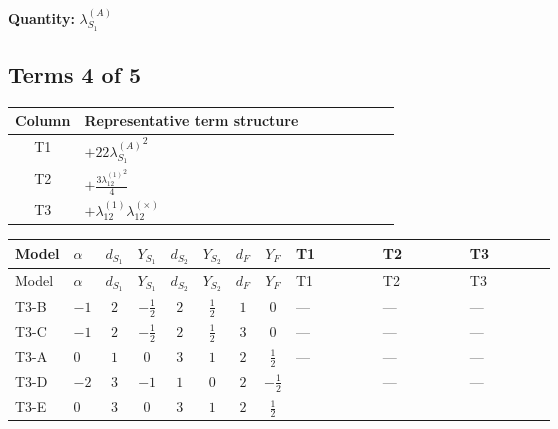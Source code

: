 \documentclass[8pt]{article}
\begin{document}
\begin{landscape}
\begin{longtable}{@{}llcccccc >{\raggedright\arraybackslash}p{0.21\linewidth} >{\raggedright\arraybackslash}p{0.21\linewidth} >{\raggedright\arraybackslash}p{0.21\linewidth}@{}}
\midrule
\bottomrule
\end{longtable}
\clearpage
\noindent\textbf{Quantity: }$\lambda_{S_1}^{(A)}$\par\smallskip
\subsection*{Terms 4 of 5}
\begin{center}
\begin{tabular}{@{}c >{\raggedright\arraybackslash}p{0.82\linewidth}@{}}
\toprule
Column & Representative term structure \\
\midrule
T1 & \(\displaystyle +22 {\lambda_{S_1}^{(A)}}^2\) \\
\midrule
T2 & \(\displaystyle +\frac{3 {\lambda_{12}^{(1)}}^2}{4}\) \\
\midrule
T3 & \(\displaystyle +{\lambda_{12}^{(1)}} {\lambda_{12}^{(\times)}}\) \\
\midrule
\bottomrule
\end{tabular}
\end{center}
\smallskip
\tiny
\begin{longtable}{@{}llcccccc >{\raggedright\arraybackslash}p{0.21\linewidth} >{\raggedright\arraybackslash}p{0.21\linewidth} >{\raggedright\arraybackslash}p{0.21\linewidth}@{}}
\toprule
Model & $\alpha$ & $d_{S_1}$ & $Y_{S_1}$ & $d_{S_2}$ & $Y_{S_2}$ & $d_F$ & $Y_F$ & T1 & T2 & T3 \\
\midrule
\endfirsthead
\toprule
Model & $\alpha$ & $d_{S_1}$ & $Y_{S_1}$ & $d_{S_2}$ & $Y_{S_2}$ & $d_F$ & $Y_F$ & T1 & T2 & T3 \\
\midrule
\endhead
T3-B & $-1$ & $2$ & $-\frac{1}{2}$ & $2$ & $\frac{1}{2}$ & $1$ & $0$ & --- & --- & --- \\
\midrule
T3-C & $-1$ & $2$ & $-\frac{1}{2}$ & $2$ & $\frac{1}{2}$ & $3$ & $0$ & --- & --- & --- \\
\midrule
T3-A & $0$ & $1$ & $0$ & $3$ & $1$ & $2$ & $\frac{1}{2}$ & --- & --- & --- \\
\midrule
T3-D & $-2$ & $3$ & $-1$ & $1$ & $0$ & $2$ & $-\frac{1}{2}$ & \scriptsize\adjustbox{max width=\linewidth}{$\begin{gathered} +22 {\lambda_{S_1}^{(A)}}^2\end{gathered}$} & --- & --- \\
\midrule
T3-E & $0$ & $3$ & $0$ & $3$ & $1$ & $2$ & $\frac{1}{2}$ & \scriptsize\adjustbox{max width=\linewidth}{$\begin{gathered} +22 {\lambda_{S_1}^{(A)}}^2\end{gathered}$} & \scriptsize\adjustbox{max width=\linewidth}{$\begin{gathered} +\frac{3 {\lambda_{12}^{(1)}}^2}{4}\end{gathered}$} & \scriptsize\adjustbox{max width=\linewidth}{$\begin{gathered} +{\lambda_{12}^{(1)}} {\lambda_{12}^{(\times)}}\end{gathered}$} \\

\end{longtable}
\end{landscape}
\end{document}
